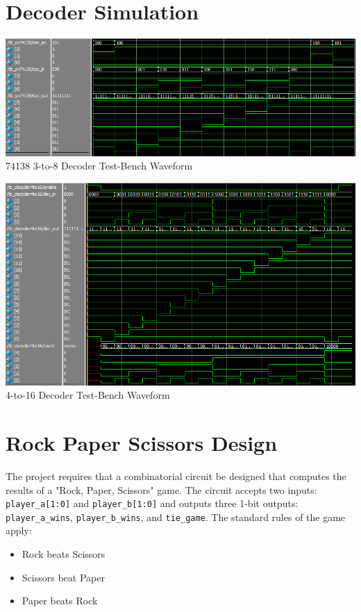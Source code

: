 \documentclass[12pt,letterpaper,titlepage]{article}
\begin{document}
\begin{raggedright}
\clearpage

\section{Decoder Simulation}
\begin{center}
\includegraphics[width=\textwidth]{tb_3to8}
74138 3-to-8 Decoder Test-Bench Waveform
\end{center}

\begin{center}
\includegraphics[width=\textwidth, height=\textheight, keepaspectratio=true]{tb_4to16}
4-to-16 Decoder Test-Bench Waveform
\end{center}

\clearpage

\section{Rock Paper Scissors Design}

The project requires that a combinatorial circuit be designed that computes the results of a "Rock, Paper, Scissors" game. The circuit accepts two inputs: \texttt{player\_a[1:0]} and \texttt{player\_b[1:0]} and outputs three 1-bit outputs: \texttt{player\_a\_wins}, \texttt{player\_b\_wins}, and \texttt{tie\_game}. The standard rules of the game apply: 
\begin{itemize}
\item Rock beats Scissors
\item Scissors beat Paper
\item Paper beats Rock
\end{itemize}


\end{raggedright}
\end{document}
